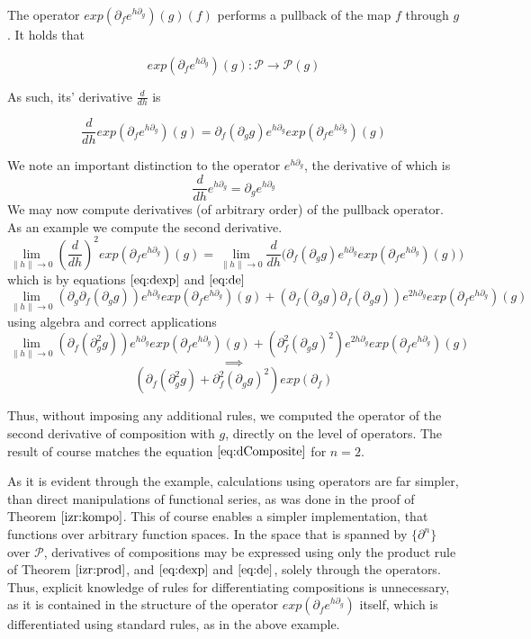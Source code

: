 \documentclass{article}
\newcommand{\dP}{\mathcal{P}}
\newcommand{\D}{\partial}
\begin{document}
 The operator $exp(\D_fe^{h\D_g})(g)(f)$ performs a pullback of the map $f$ through $g$. It holds that
 
 \begin{equation}
 exp(\D_fe^{h\D_g})(g): \dP\to\dP(g)
 \end{equation}
 
 As such, its' derivative $\frac{d}{dh}$ is
 
 \begin{equation}\label{eq:dexp}
 \frac{d}{dh}exp(\D_fe^{h\D_g})(g)=\D_f(\D_gg)e^{h\D_g}exp(\D_fe^{h\D_g})(g)
 \end{equation}
 
 We note an important distinction to the operator $e^{h\D_g}$, the derivative of which is
 \begin{equation}\label{eq:de}
\frac{d}{dh}e^{h\D_g}=\D_ge^{h\D_g}
 \end{equation}
 We may now compute derivatives (of arbitrary order) of the pullback operator. As an example we compute the second derivative.
 $$\lim\limits_{\lVert h\rVert\to 0}(\frac{d}{dh})^2exp(\D_fe^{h\D_g})(g)=\lim\limits_{\lVert h\rVert\to 0}\frac{d}{dh}\Big(\D_f(\D_gg)e^{h\D_g}exp(\D_fe^{h\D_g})(g)\Big)$$
 which is by equations $\eqref{eq:dexp}$ and $\eqref{eq:de}$
 $$\lim\limits_{\lVert h\rVert\to 0}(\D_g\D_f(\D_gg))e^{h\D_g}exp(\D_fe^{h\D_g})(g)+(\D_f(\D_gg)\D_f(\D_gg))e^{2h\D_g}exp(\D_fe^{h\D_g})(g)$$
 using algebra and correct applications
 $$\lim\limits_{\lVert h\rVert\to 0}(\D_f(\D^2_gg))e^{h\D_g}exp(\D_fe^{h\D_g})(g)+(\D^2_f(\D_gg)^2)e^{2h\D_g}exp(\D_fe^{h\D_g})(g)$$
  $$\implies$$
 \begin{equation}
	(\D_f(\D^2_gg)+\D^2_f(\D_gg)^2)exp(\D_f)
 \end{equation}
 
 Thus, without imposing any additional rules, we computed the operator of the second derivative of composition with $g$, directly on the level of operators. The result of course matches the equation $\eqref{eq:dComposite}$ for $n=2$.
 
 As it is evident through the example, calculations using operators are far simpler, than direct manipulations of functional series, as was done in the proof of Theorem $\ref{izr:kompo}$. This of course enables a simpler implementation, that functions over arbitrary function spaces. In the space that is spanned by $\{\D^n\}$ over $\dP$, derivatives of compositions may be expressed using only the product rule of Theorem $\ref{izr:prod}$, and $\eqref{eq:dexp}$ and $\eqref{eq:de}$, solely through the operators. Thus, explicit knowledge of rules for differentiating compositions is unnecessary, as it is contained in the structure of the operator $exp(\D_fe^{h\D_g})$ itself, which is differentiated using standard rules, as in the above example.
 
\end{document}
